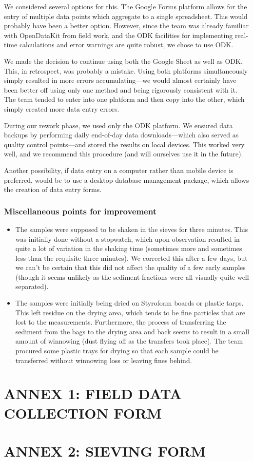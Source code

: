 \documentclass[a4paper,12pt,twoside]{article}
\begin{document}
We considered several options for this. The Google Forms platform allows for the entry of multiple data points which aggregate to a single spreadsheet. This would probably have been a better option. However, since the team was already familiar with OpenDataKit from field work, and the ODK facilities for implementing real-time calculations and error warnings are quite robust, we chose to use ODK.

We made the decision to continue using both the Google Sheet as well as ODK. This, in retrospect, was probably a mistake. Using both platforms simultaneously simply resulted in more errors accumulating---we would almost certainly have been better off using only one method and being rigorously consistent with it. The team tended to enter into one platform and then copy into the other, which simply created more data entry errors.

During our rework phase, we used only the ODK platform. We ensured data backups by performing daily end-of-day data downloads---which also served as quality control points---and stored the results on local devices. This worked very well, and we recommend this procedure (and will ourselves use it in the future).

Another possibility, if data entry on a computer rather than mobile device is preferred, would be to use a desktop database management package, which allows the creation of data entry forms.

\color{RHblue}
\subsubsection{Miscellaneous points for improvement}
\color{RHgrey}
\begin{itemize}
  \item The samples were supposed to be shaken in the sieves for three minutes. This was initially done without a stopwatch, which upon observation resulted in quite a lot of variation in the shaking time (sometimes more and sometimes less than the requisite three minutes). We corrected this after a few days, but we can't be certain that this did not affect the quality of a few early samples (though it seems unlikely as the sediment fractions were all visually quite well separated).
  \item The samples were initially being dried on Styrofoam boards or plastic tarps. This left residue on the drying area, which tends to be fine particles that are lost to the measurements. Furthermore, the process of transferring the sediment from the bags to the drying area and back seems to result in a small amount of winnowing (dust flying off as the transfers took place). The team procured some plastic trays for drying so that each sample could be transferred without winnowing loss or leaving fines behind.
\end{itemize}

\newpage
\color{RHblue}
\section{ANNEX 1: FIELD DATA COLLECTION FORM}
\newpage
\section{ANNEX 2: SIEVING FORM}
\newpage
\null
\end{document}
